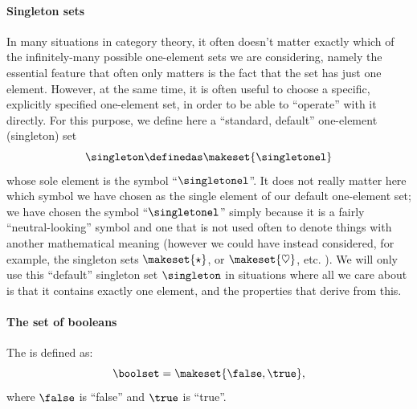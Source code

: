 \paragraph{Singleton sets}
\label{def:singleton}
In many situations in category theory, it often doesn't matter exactly which of the infinitely-many possible one-element sets we are considering, namely the essential feature that often only matters is the fact that the set has just one element.
However, at the same time, it is often useful to choose a specific, explicitly specified one-element set, in order to be able to ``operate'' with it directly.
For this purpose, we define here a ``standard, default'' one-element (singleton) set
\begin{equation}
    \singleton \definedas \makeset{\singletonel}
\end{equation}
whose sole element is the symbol ``$\singletonel$''.
It does not really matter here which symbol we have chosen as the single element of our default one-element set; we have chosen the symbol ``$\singletonel$'' simply because it is a fairly ``neutral-looking'' symbol and one that is not used often to denote things with another mathematical meaning (however we could have instead considered, for example, the singleton sets $\makeset{\star}$, or $\makeset{\heartsuit}$, etc. ).
We will only use this ``default'' singleton set $\singleton$ in situations where all we care about is that it contains exactly one element, and the properties that derive from this.

\paragraph{The set of booleans}
\label{def:booleans}
The  is defined as:
\begin{equation}
    \boolset = \makeset{ \false, \true },
\end{equation}
where $\false$ is ``false'' and $\true$ is ``true''.
